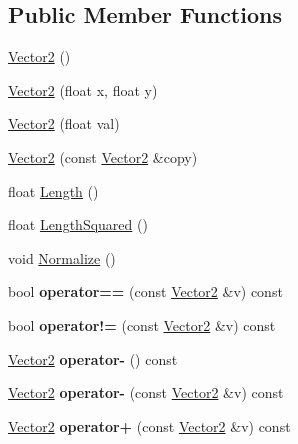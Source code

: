 \subsection*{Public Member Functions}
\begin{DoxyCompactItemize}
\item 
\hyperlink{structVector2_a22104d1809be26a419ef1f959e3761bf}{Vector2} ()
\item 
\hyperlink{structVector2_a061ab58a0e216c759d64e3746d712b12}{Vector2} (float x, float y)
\item 
\hyperlink{structVector2_afea54870cbfd859a8cefddde63c1eade}{Vector2} (float val)
\item 
\hyperlink{structVector2_a11a9a7497a068a1be452c7308a742baa}{Vector2} (const \hyperlink{structVector2}{Vector2} \&copy)
\item 
float \hyperlink{structVector2_ae7b80a14336e86c30a11218cd27a4abf}{Length} ()
\item 
float \hyperlink{structVector2_abb8185e17df25af915a6490028a47220}{Length\+Squared} ()
\item 
void \hyperlink{structVector2_a3b597b3bfeb114dd9e157b86330e087d}{Normalize} ()
\item 
\hypertarget{structVector2_a41cc3205bc01ec255df48b93654617c8}{}bool {\bfseries operator==} (const \hyperlink{structVector2}{Vector2} \&v) const \label{structVector2_a41cc3205bc01ec255df48b93654617c8}

\item 
\hypertarget{structVector2_a0ad61ef61851d0efb7cddd5ba9353ef3}{}bool {\bfseries operator!=} (const \hyperlink{structVector2}{Vector2} \&v) const \label{structVector2_a0ad61ef61851d0efb7cddd5ba9353ef3}

\item 
\hypertarget{structVector2_a5f5eb2d81dd299366ca228963ae76fa0}{}\hyperlink{structVector2}{Vector2} {\bfseries operator-\/} () const \label{structVector2_a5f5eb2d81dd299366ca228963ae76fa0}

\item 
\hypertarget{structVector2_a39dfeea6e55ef1df7b819cf35efd4a79}{}\hyperlink{structVector2}{Vector2} {\bfseries operator-\/} (const \hyperlink{structVector2}{Vector2} \&v) const \label{structVector2_a39dfeea6e55ef1df7b819cf35efd4a79}

\item 
\hypertarget{structVector2_a93473ed56b2cedcafe3690572eeeec33}{}\hyperlink{structVector2}{Vector2} {\bfseries operator+} (const \hyperlink{structVector2}{Vector2} \&v) const \label{structVector2_a93473ed56b2cedcafe3690572eeeec33}


\end{DoxyCompactItemize}
